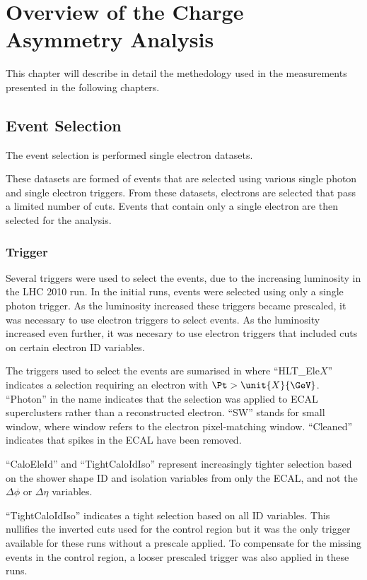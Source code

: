 \chapter[Analysis]{Overview of the Charge Asymmetry Analysis}

This chapter will describe in detail the methedology used in the measurements
presented in the following chapters. 

\section{Event Selection}

The event selection is performed single electron datasets. 

These datasets are formed of events that are selected using various single photon and single
electron triggers. From these datasets, electrons are selected that pass a limited
number of cuts. Events that contain only a single electron are then selected for
the analysis.

\subsection{Trigger}

Several triggers were used to select the events, due to the increasing
luminosity in the \ac{LHC} 2010 run.
In the initial runs, events were selected using only a single photon trigger. 
As the luminosity increased these triggers became prescaled, it was
necessary to use electron triggers to select events. 
As the luminosity increased even further, it was necesary to use electron
triggers that included cuts on certain electron ID variables.

The triggers used to select the events are sumarised in 
where ``HLT\_Ele$X$'' indicates a selection requiring an electron with  $\Pt > \unit{X}{\GeV}$. 
``Photon'' in the name indicates that the selection was applied to ECAL
superclusters rather than a reconstructed electron. 
``SW'' stands for small window, where window refers to the electron
pixel-matching window. 
 ``Cleaned'' indicates that spikes in the \ac{ECAL} have been removed.  

``CaloEleId'' and ``TightCaloIdIso'' represent increasingly tighter selection
based on the shower shape ID and isolation variables from only the \ac{ECAL},
and not the $\Delta\phi$ or $\Delta\eta$ variables.  

``TightCaloIdIso'' indicates a tight selection based on all ID variables. 
This nullifies the inverted cuts used for the control region but
it was the only trigger available for these runs without a prescale applied.
To compensate for the missing events in the control region, a looser prescaled
trigger was also applied in these runs.

